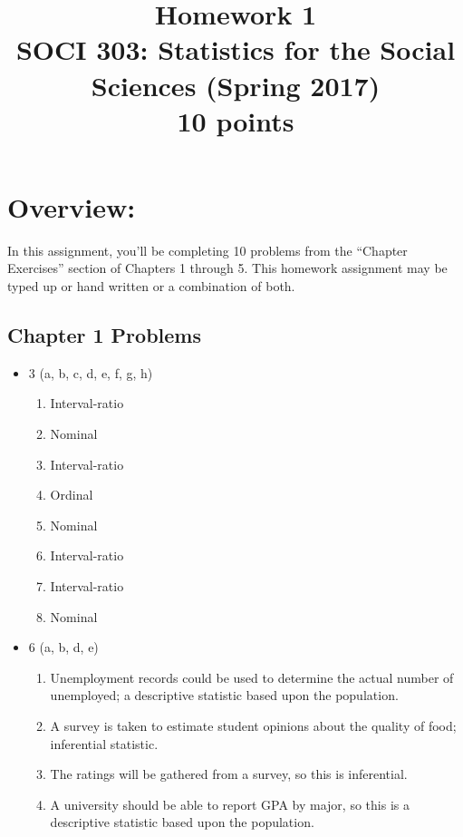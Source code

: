 \documentclass{article}
\begin{document}
\title{Homework 1\\ SOCI 303: Statistics for the Social Sciences (Spring 2017) \\ {\large{10 points}}}
\author[*]{}
\date{}
\maketitle



\section*{Overview:}
In this assignment, you'll be completing 10 problems from the ``Chapter Exercises'' section of Chapters 1 through 5. This homework assignment may be typed up or hand written or a combination of both.

\subsection*{Chapter 1 Problems}
\begin{itemize}
\item 3 (a, b, c, d, e, f, g, h) 
	\begin{enumerate}[label=(\alph*)]
	\item Interval-ratio
	\item Nominal
	\item Interval-ratio
	\item Ordinal
	\item Nominal
	\item Interval-ratio
	\item Interval-ratio
	\item Nominal 	
	\end{enumerate}
\item 6 (a, b, d, e) 
	\begin{enumerate}[label=(\alph*)]
	\item Unemployment records could be used to determine the actual number of unemployed; a descriptive statistic based upon the population. 
	\item A survey is taken to estimate student opinions about the quality of food; inferential statistic. \addtocounter{enumi}{1} %
	\item The ratings will be gathered from a survey, so this is inferential.
	\item A university should be able to report GPA by major, so this is a descriptive statistic based upon the population. 
	\end{enumerate}
\end{itemize}
\end{document}
